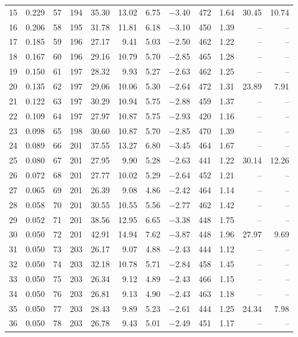\begin{table}[H]
\begin{tabular}{rrrrrrrrrrrr}
15 & 0.229 & 57 & 194 & 35.30 & 13.02 & 6.75 & $-$3.40 & 472 & 1.64 & 30.45 & 10.74 \\
16 & 0.206 & 58 & 195 & 31.78 & 11.81 & 6.18 & $-$3.10 & 450 & 1.39 & -- & -- \\
17 & 0.185 & 59 & 196 & 27.17 & 9.41 & 5.03 & $-$2.50 & 462 & 1.22 & -- & -- \\
18 & 0.167 & 60 & 196 & 29.16 & 10.79 & 5.70 & $-$2.85 & 465 & 1.28 & -- & -- \\
19 & 0.150 & 61 & 197 & 28.32 & 9.93 & 5.27 & $-$2.63 & 462 & 1.25 & -- & -- \\
20 & 0.135 & 62 & 197 & 29.06 & 10.06 & 5.30 & $-$2.64 & 472 & 1.31 & 23.89 & 7.91 \\
21 & 0.122 & 63 & 197 & 30.29 & 10.94 & 5.75 & $-$2.88 & 459 & 1.37 & -- & -- \\
22 & 0.109 & 64 & 197 & 27.97 & 10.87 & 5.75 & $-$2.93 & 420 & 1.16 & -- & -- \\
23 & 0.098 & 65 & 198 & 30.60 & 10.87 & 5.70 & $-$2.85 & 470 & 1.39 & -- & -- \\
24 & 0.089 & 66 & 201 & 37.55 & 13.27 & 6.80 & $-$3.45 & 464 & 1.67 & -- & -- \\
25 & 0.080 & 67 & 201 & 27.95 & 9.90 & 5.28 & $-$2.63 & 441 & 1.22 & 30.14 & 12.26 \\
26 & 0.072 & 68 & 201 & 27.77 & 10.02 & 5.29 & $-$2.64 & 452 & 1.21 & -- & -- \\
27 & 0.065 & 69 & 201 & 26.39 & 9.08 & 4.86 & $-$2.42 & 464 & 1.14 & -- & -- \\
28 & 0.058 & 70 & 201 & 30.55 & 10.55 & 5.56 & $-$2.77 & 462 & 1.42 & -- & -- \\
29 & 0.052 & 71 & 201 & 38.56 & 12.95 & 6.65 & $-$3.38 & 448 & 1.75 & -- & -- \\
30 & 0.050 & 72 & 201 & 42.91 & 14.94 & 7.62 & $-$3.87 & 448 & 1.96 & 27.97 & 9.69 \\
31 & 0.050 & 73 & 203 & 26.17 & 9.07 & 4.88 & $-$2.43 & 444 & 1.12 & -- & -- \\
32 & 0.050 & 74 & 203 & 32.18 & 10.78 & 5.71 & $-$2.84 & 458 & 1.45 & -- & -- \\
33 & 0.050 & 75 & 203 & 26.34 & 9.12 & 4.89 & $-$2.43 & 466 & 1.15 & -- & -- \\
34 & 0.050 & 76 & 203 & 26.81 & 9.13 & 4.90 & $-$2.43 & 463 & 1.18 & -- & -- \\
35 & 0.050 & 77 & 203 & 28.43 & 9.89 & 5.23 & $-$2.61 & 444 & 1.25 & 24.34 & 7.98 \\
36 & 0.050 & 78 & 203 & 26.78 & 9.43 & 5.01 & $-$2.49 & 451 & 1.17 & -- & -- \\

\end{tabular}
\end{table}
